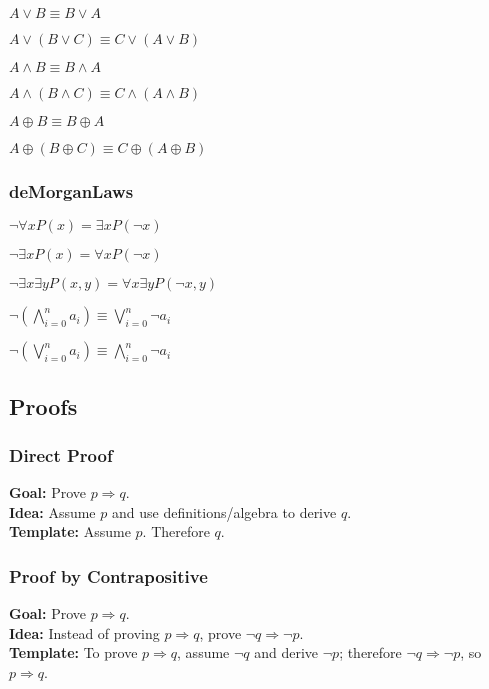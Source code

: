 \documentclass[5pt]{article}
\begin{document}
\begin{multicols}{2}
\begin{properties}
    \begin{itemize*}
        \item $A\lor B\equiv B\lor A$
        \item $A\lor (B\lor C)\equiv C\lor (A\lor B)$
        \item $A\land B\equiv B\land A$
        \item $A\land(B\land C)\equiv C\land (A\land B)$
        \item $A\oplus B\equiv B\oplus A$
        \item $A\oplus(B\oplus C)\equiv C\oplus (A\oplus B)$
    \end{itemize*}
\end{properties}

\subsubsection{deMorganLaws}
\begin{itemize*}
    \item $\lnot\forall xP(x)=\exists xP(\lnot x)$
    \item $\lnot\exists xP(x)=\forall xP(\lnot x)$
    \item $\lnot\exists x\exists yP(x,y)=\forall x\exists yP(\lnot x,y)$
    \item $\lnot\left(\bigwedge_{i=0}^na_i\right)\equiv\bigvee_{i=0}^n\lnot a_i$
    \item $\lnot\left(\bigvee_{i=0}^na_i\right)\equiv\bigwedge_{i=0}^n\lnot a_i$
\end{itemize*}


\subsection{Proofs}
\subsubsection{Direct Proof}
\textbf{Goal:} Prove $p\Rightarrow q$.\\
\textbf{Idea:} Assume $p$ and use definitions/algebra to derive $q$.\\
\textbf{Template:} Assume $p$. \; \;\; Therefore $q$.\\

\subsubsection{Proof by Contrapositive}
\textbf{Goal:} Prove $p\Rightarrow q$.\\
\textbf{Idea:} Instead of proving $p\Rightarrow q$, prove $\lnot q\Rightarrow \lnot p$.\\
\textbf{Template:} To prove $p\Rightarrow q$, assume $\lnot q$ and derive $\lnot p$; therefore $\lnot q\Rightarrow \lnot p$, so $p\Rightarrow q$.\\


\end{multicols}
\end{document}
